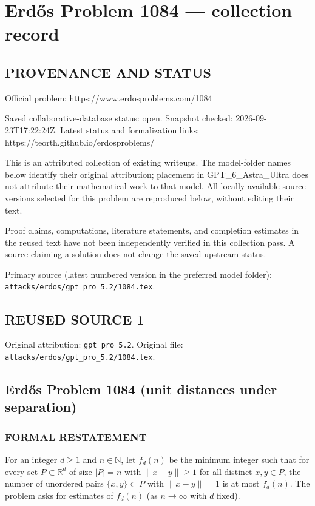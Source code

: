 \section*{Erd\H{o}s Problem 1084 --- collection record}

\subsection*{PROVENANCE AND STATUS}
Official problem: https://www.erdosproblems.com/1084

Saved collaborative-database status: open.
Snapshot checked: 2026-09-23T17:22:24Z.
Latest status and formalization links: https://teorth.github.io/erdosproblems/

This is an attributed collection of existing writeups. The model-folder names below identify their original attribution; placement in GPT\_6\_Astra\_Ultra does not attribute their mathematical work to that model. All locally available source versions selected for this problem are reproduced below, without editing their text.

Proof claims, computations, literature statements, and completion estimates in the reused text have not been independently verified in this collection pass. A source claiming a solution does not change the saved upstream status.

Primary source (latest numbered version in the preferred model folder): \texttt{attacks/erdos/gpt\_pro\_5.2/1084.tex}.

\subsection*{REUSED SOURCE 1}
Original attribution: \texttt{gpt\_pro\_5.2}.
Original file: \texttt{attacks/erdos/gpt\_pro\_5.2/1084.tex}.


\subsection*{Erd\H{o}s Problem 1084 (unit distances under separation)}

\subsubsection*{FORMAL RESTATEMENT}
For an integer \(d\ge 1\) and \(n\in\mathbb{N}\), let \(f_d(n)\) be the minimum integer such that for every set
\(P\subset\mathbb{R}^d\) of size \(|P|=n\) with \(\|x-y\|\ge 1\) for all distinct \(x,y\in P\), the number of unordered pairs \(\{x,y\}\subset P\) with \(\|x-y\|=1\) is at most \(f_d(n)\).
The problem asks for estimates of \(f_d(n)\) (as \(n\to\infty\) with \(d\) fixed).

